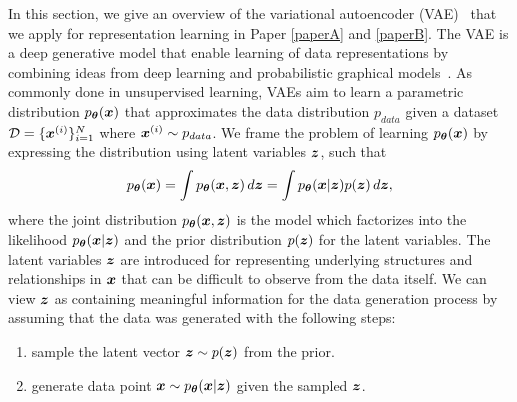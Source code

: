In this section, we give an overview of the variational autoencoder (VAE)~\cite{kingma2013auto, kingma2019introduction} that we apply for representation learning in Paper \ref{paperA} and \ref{paperB}. 
The VAE is a deep generative model that enable learning of data representations %
by combining ideas from deep learning and probabilistic graphical models~\cite{koller2009probabilistic}. 
As commonly done in unsupervised learning, VAEs aim to learn a parametric distribution $p_{{\bm{\theta}}}({\bm{x}})$ that approximates the data distribution $p_{data}$ given a dataset ${\mathcal{D}} = \{{\bm{x}}^{(i)}\}_{i=1}^{N}$ where ${\bm{x}}^{(i)} \sim p_{data}$. We frame the problem of learning $p_{{\bm{\theta}}}({\bm{x}})$ by expressing the distribution using latent variables ${\bm{z}}$, such that
\begin{equation}\label{eq:px}
	p_{{\bm{\theta}}}({\bm{x}}) = \int p_{{\bm{\theta}}}({\bm{x}}, {\bm{z}}) \, d{\bm{z}} = \int p_{{\bm{\theta}}}({\bm{x}} | {\bm{z}}) p({\bm{z}}) \, d{\bm{z}},
\end{equation}
where the joint distribution $p_{{\bm{\theta}}}({\bm{x}}, {\bm{z}})$ is the model which factorizes into the likelihood $p_{{\bm{\theta}}}({\bm{x}} | {\bm{z}})$ and the prior distribution $p({\bm{z}})$ for the latent variables. The latent variables ${\bm{z}}$ are introduced for representing underlying structures and relationships in ${\bm{x}}$ that can be difficult to observe from the data itself. We can view ${\bm{z}}$ as containing meaningful information for the data generation process by assuming that the data was generated with the following steps: 
\begin{enumerate}[topsep=1pt,noitemsep]
	\item sample the latent vector ${\bm{z}} \sim p({\bm{z}})$ from the prior.
	\item generate data point ${\bm{x}} \sim p_{{\bm{\theta}}}({\bm{x}} | {\bm{z}})$ given the sampled ${\bm{z}}$.
\end{enumerate}

\vspace{-3mm}
